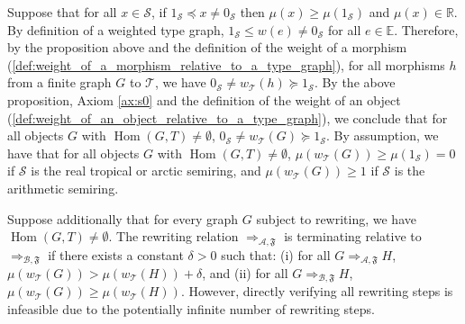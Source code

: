 
    Suppose that for all $x \in \mathcal{S}$, if $ 1_\mathcal{S} \preceq x \neq 0_\mathcal{S}$ then $\mu(x) \geq \mu(1_\mathcal{S})$ and $\mu(x) \in \mathbb{R}$. 
    By definition of a weighted type graph, $1_\mathcal{S} \leq w(e)\neq 0_\mathcal{S}$ for all $e\in\mathbb{E}$.
    Therefore, by the proposition above and the definition of the weight of a morphism (\autoref{def:weight_of_a_morphism_relative_to_a_type_graph}), for all morphisms \( h \) from a finite graph $G$ to $\mathcal{T}$, we have \( 0_\mathcal{S} \neq w_\mathcal{T}(h) \succeq 1_\mathcal{S} \). 
    By the above proposition, Axiom \eqref{ax:s0} and the definition of the weight of an object (\autoref{def:weight_of_an_object_relative_to_a_type_graph}), we conclude that for all objects \( G \) with $\operatorname{Hom}(G,T)\neq \emptyset$, \( 0_\mathcal{S} \neq w_\mathcal{T}(G) \succeq 1_\mathcal{S} \). By assumption, we have that for all objects \( G \) with $\operatorname{Hom}(G,T)\neq \emptyset$, \( \mu(w_\mathcal{T}(G)) \geq \mu(1_\mathcal{S}) = 0 \) if $\mathcal{S}$ is the real tropical or arctic semiring, and \( \mu(w_\mathcal{T}(G)) \geq 1 \) if $\mathcal{S}$ is the arithmetic semiring.

Suppose additionally that for every graph $G$ subject to rewriting, we have $\operatorname{Hom}(G,T)\neq \emptyset$. The rewriting relation \( \Rightarrow_{\mathcal{A},\mathfrak{F}} \) is terminating relative to $\Rightarrow_{\mathcal{B},\mathfrak{F}}$ if there exists a constant $\delta > 0$ such that: (i) for all \(G \Rightarrow_{\mathcal{A},\mathfrak{F}} H\), \( \mu(w_\mathcal{T}(G)) > \mu(w_\mathcal{T}(H)) + \delta \), and (ii) for all \(G \Rightarrow_{\mathcal{B},\mathfrak{F}} H\), \( \mu(w_\mathcal{T}(G)) \geq \mu(w_\mathcal{T}(H)) \). However, directly verifying all rewriting steps is infeasible due to the potentially infinite number of rewriting steps.


